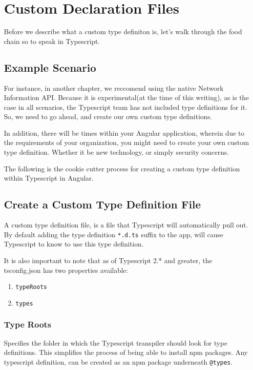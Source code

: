 \chapter{ Custom Declaration Files }
Before we describe what a custom type definiton is, let's walk through the food chain so to speak in Typescript. 



\section{Example Scenario}
For instance, in another chapter, we reccomend using the native Network 
Information API. Because it is experimental(at the time of this writing),
as is the case in all scenarios, the Typescript team has not included 
type definitions for it. So, we need to go ahead, and create our own 
custom type definitions. 

In addition, there will be times within your Angular application, wherein 
due to the requirements of your organization, you might need to create your 
own custom type definition. Whether it be new technology, or simply security
concerns. 

The following is the cookie cutter process for creating a custom type 
definition within Typescript in Angular. 

\section{Create a Custom Type Definition File}
A custom type definition file, is a file that Typescript will automatically 
pull out. By default adding the type definition \lstinline{*.d.ts} suffix to
the app, will cause Typescript to know to use this type definition.

It is also important to note that as of Typescript 2.* and greater, the
tsconfig.json has two properties available: 
\begin{enumerate}
  \item \lstinline{typeRoots}
  \item \lstinline{types}
\end{enumerate}

\subsection{Type Roots}
Specifies the folder in which the Typescript transpiler should look for type 
definitions. This simplifies the process of being able to install npm packages.
Any typescript definition, can be created as an npm package underneath \lstinline{@types}.


